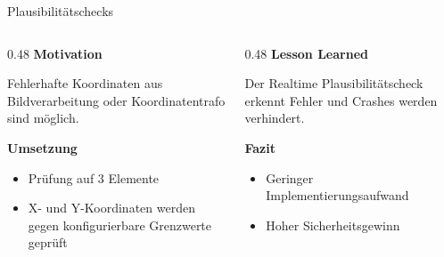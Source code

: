 \documentclass[aspectratio=169]{beamer}
\begin{document}
	\begin{frame}{Plausibilitätschecks}
    \begin{columns}
        \begin{column}{0.48\textwidth}
            \textbf{Motivation}

            Fehlerhafte Koordinaten aus Bildverarbeitung oder Koordinatentrafo sind möglich.
           
            \vspace{0.5em}

            \textbf{Umsetzung}
            \begin{itemize}
                \item Prüfung auf 3 Elemente
                \item X- und Y-Koordinaten werden gegen konfigurierbare
                      Grenzwerte geprüft
            \end{itemize}
        \end{column}
        \begin{column}{0.48\textwidth}
            \textbf{Lesson Learned}
            \vspace{0.3em}
			
            Der Realtime Plausibilitätscheck erkennt Fehler und Crashes werden verhindert. 
            \vspace{0.5em}

            \textbf{Fazit}
            \begin{itemize}
                \item Geringer Implementierungsaufwand
                \item Hoher Sicherheitsgewinn
            \end{itemize}
        \end{column}
    \end{columns}
\end{frame}
\end{document}
